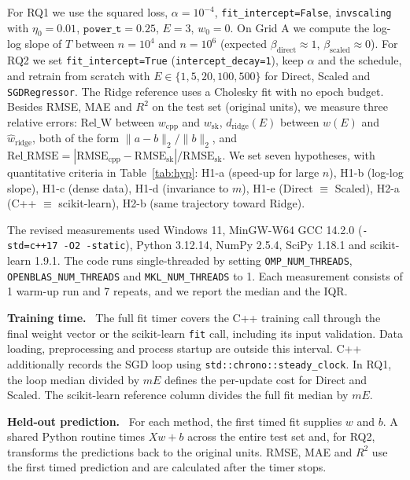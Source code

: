 \documentclass[10pt,a4paper,twocolumn]{article}
\newcommand{\sk}{\texttt{SGDRegressor}}
\newcommand{\relW}{\mathrm{Rel\_W}}
\newcommand{\relR}{\mathrm{Rel\_RMSE}}
\newcommand{\dridge}{d_{\mathrm{ridge}}}
\newcommand{\hd}[1]{\textbf{#1}\ }          %
\begin{document}
For RQ1 we use the squared loss, $\alpha=10^{-4}$, \texttt{fit\_intercept=False}, \texttt{invscaling} with $\eta_0=0.01$, $\texttt{power\_t}=0.25$, $E=3$, $w_0=0$. On Grid A we compute the log-log slope of $T$ between $n=10^4$ and $n=10^6$ (expected $\beta_{\mathrm{direct}}\approx1$, $\beta_{\mathrm{scaled}}\approx0$). For RQ2 we set \texttt{fit\_intercept=True} (\texttt{intercept\_decay=1}), keep $\alpha$ and the schedule, and retrain from scratch with $E\in\{1,5,20,100,500\}$ for Direct, Scaled and \sk{}. The Ridge reference uses a Cholesky fit with no epoch budget. Besides RMSE, MAE and $R^2$ on the test set (original units), we measure three relative errors: $\relW$ between $w_{\mathrm{cpp}}$ and $w_{\mathrm{sk}}$, $\dridge(E)$ between $w(E)$ and $\hat w_{\mathrm{ridge}}$, both of the form $\|a-b\|_2/\|b\|_2$, and $\relR=|\mathrm{RMSE}_{\mathrm{cpp}}-\mathrm{RMSE}_{\mathrm{sk}}|/\mathrm{RMSE}_{\mathrm{sk}}$. We set seven hypotheses, with quantitative criteria in Table~\ref{tab:hyp}: H1-a (speed-up for large $n$), H1-b (log-log slope), H1-c (dense data), H1-d (invariance to $m$), H1-e (Direct $\equiv$ Scaled), H2-a (C++ $\equiv$ scikit-learn), H2-b (same trajectory toward Ridge).

The revised measurements used Windows 11, MinGW-W64 GCC 14.2.0 (\texttt{-std=c++17 -O2 -static}), Python 3.12.14, NumPy 2.5.4, SciPy 1.18.1 and scikit-learn 1.9.1. The code runs single-threaded by setting \texttt{OMP\_NUM\_THREADS}, \texttt{OPENBLAS\_NUM\_THREADS} and \texttt{MKL\_NUM\_THREADS} to 1. Each measurement consists of 1 warm-up run and 7 repeats, and we report the median and the IQR.

\hd{Training time.} The full fit timer covers the C++ training call through the final weight vector or the scikit-learn \texttt{fit} call, including its input validation. Data loading, preprocessing and process startup are outside this interval. C++ additionally records the SGD loop using \texttt{std::chrono::steady\_clock}. In RQ1, the loop median divided by $mE$ defines the per-update cost for Direct and Scaled. The scikit-learn reference column divides the full fit median by $mE$.

\hd{Held-out prediction.} For each method, the first timed fit supplies $w$ and $b$. A shared Python routine times $Xw+b$ across the entire test set and, for RQ2, transforms the predictions back to the original units. RMSE, MAE and $R^2$ use the first timed prediction and are calculated after the timer stops.

\end{document}

